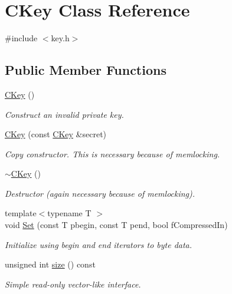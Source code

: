 \hypertarget{class_c_key}{}\section{C\+Key Class Reference}
\label{class_c_key}


{\ttfamily \#include $<$key.\+h$>$}

\subsection*{Public Member Functions}
\begin{DoxyCompactItemize}
\item 
\hyperlink{class_c_key_a8f4ca910c7b7e729a3f2a5c59d060d3d}{C\+Key} ()
\begin{DoxyCompactList}\small\item\em Construct an invalid private key. \end{DoxyCompactList}\item 
\hyperlink{class_c_key_afcea34cefd25675f4cf9b03eaa4bb7d9}{C\+Key} (const \hyperlink{class_c_key}{C\+Key} \&secret)
\begin{DoxyCompactList}\small\item\em Copy constructor. This is necessary because of memlocking. \end{DoxyCompactList}\item 
\hyperlink{class_c_key_a57d5b254748cef054c40f99c1c339147}{$\sim$\+C\+Key} ()
\begin{DoxyCompactList}\small\item\em Destructor (again necessary because of memlocking). \end{DoxyCompactList}\item 
{\footnotesize template$<$typename T $>$ }\\void \hyperlink{class_c_key_aaa13d5f08456bba094210c5eeabf64c8}{Set} (const T pbegin, const T pend, bool f\+Compressed\+In)
\begin{DoxyCompactList}\small\item\em Initialize using begin and end iterators to byte data. \end{DoxyCompactList}\item 
unsigned int \hyperlink{class_c_key_a6329a38926a8af8112d06da96afbfe39}{size} () const 
\begin{DoxyCompactList}\small\item\em Simple read-\/only vector-\/like interface. \end{DoxyCompactList}\item 

\end{DoxyCompactItemize}
